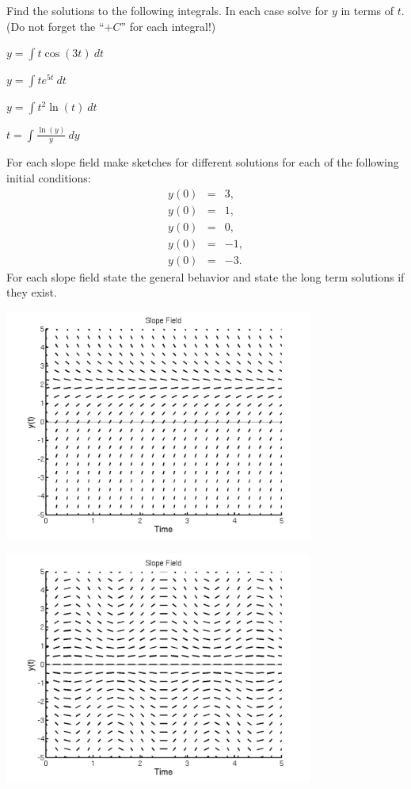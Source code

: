 \begin{problem}
\item Find the solutions to the following integrals. In each case
  solve for $y$ in terms of $t$. (Do not forget the ``$+C$'' for each
  integral!)
  \begin{subproblem}
    \item $y = \int t\cos(3t) ~ dt$
      \vfill
    \item $y = \int t e^{5t} ~ dt$
      \vfill
    \item $y = \int t^2 \ln(t) ~ dt$
      \vfill
    \item $t = \int \frac{\ln(y)}{y} ~ dy$
      \vfill
  \end{subproblem}

\clearpage

\item For each slope field make sketches for different solutions for
  each of the following initial conditions:
  \begin{eqnarray*}
    y(0) & = & 3, \\
    y(0) & = & 1, \\
    y(0) & = & 0, \\
    y(0) & = & -1, \\
    y(0) & = & -3.
  \end{eqnarray*}
  For each slope field state the general behavior and state the long
  term solutions if they exist.

  \begin{subproblem}
    \item \includegraphics[height=3.0in]{sfSteadyWk1}
    \item \includegraphics[height=3.0in]{sfOscillateWk1}


\end{subproblem}
\end{problem}
